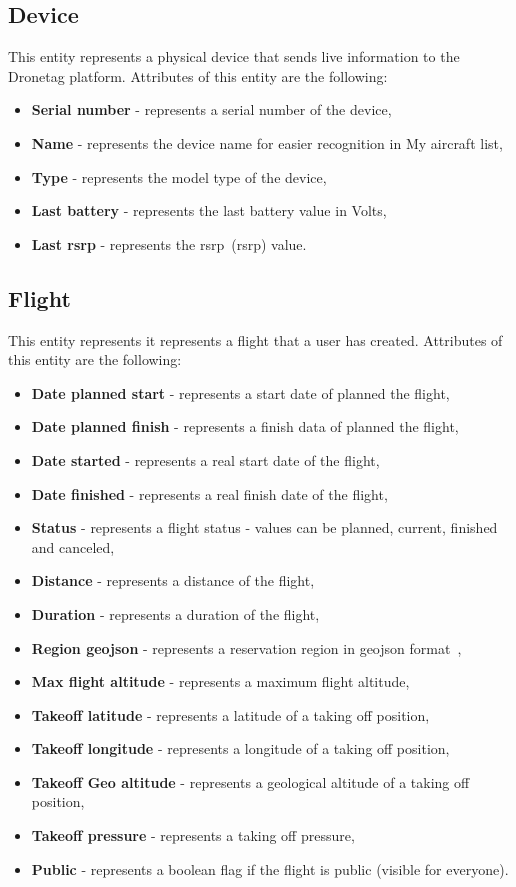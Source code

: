 \subsection{Device}\label{subsec:device}
This entity represents a physical device that sends live information to the Dronetag platform.
Attributes of this entity are the following:
\begin{itemize}
    \item \textbf{Serial number} - represents a serial number of the device,
    \item \textbf{Name} - represents the device name for easier recognition in My aircraft list,
    \item \textbf{Type} - represents the model type of the device,
    \item \textbf{Last battery} - represents the last battery value in Volts,
    \item \textbf{Last \acrshort{rsrp}} - represents the \acrshort{rsrp}~(\acrlong{rsrp}) value.
\end{itemize}

\subsection{Flight}\label{subsec:flight}
This entity represents it represents a flight that a user has created.
Attributes of this entity are the following:
\begin{itemize}
    \item \textbf{Date planned start} - represents a start date of planned the flight,
    \item \textbf{Date planned finish} - represents a finish data of planned the flight,
    \item \textbf{Date started} - represents a real start date of the flight,
    \item \textbf{Date finished} - represents a real finish date of the flight,
    \item \textbf{Status} - represents a flight status - values can be planned, current, finished and canceled,
    \item \textbf{Distance} - represents a distance of the flight,
    \item \textbf{Duration} - represents a duration of the flight,
    \item \textbf{Region \acrshort{geojson}} - represents a reservation region in \acrshort{geojson} format~\cite{geoJson},
    \item \textbf{Max flight altitude} - represents a maximum flight altitude,
    \item \textbf{Takeoff latitude} - represents a latitude of a taking off position,
    \item \textbf{Takeoff longitude} - represents a longitude of a taking off position,
    \item \textbf{Takeoff Geo altitude} - represents a geological altitude of a taking off position,
    \item \textbf{Takeoff pressure} - represents a taking off pressure,
    \item \textbf{Public} - represents a boolean flag if the flight is public (visible for everyone).
\end{itemize}

